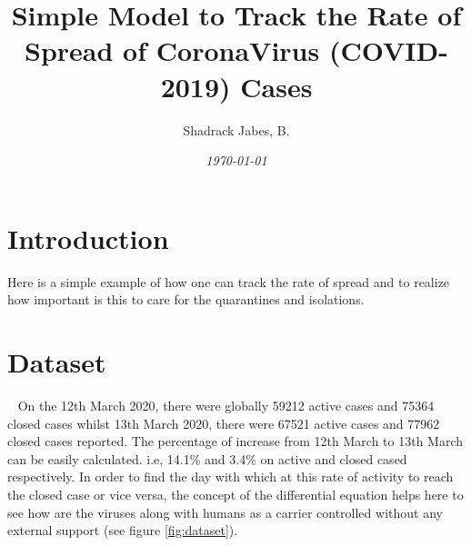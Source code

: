 \documentclass[twocolumn]{article}
\title {Simple Model to Track the Rate of Spread of CoronaVirus (COVID-2019) Cases}
\author{Shadrack Jabes, B.}
\date{\it{\today}}
\begin{document}
\maketitle
\section{Introduction}
Here is a simple example of how one can track the rate of spread and to realize how important is this to care for the quarantines and isolations. 
\section{Dataset} 
On the 12th March 2020, there were globally 59212 active cases and 75364 closed cases whilst 13th March 2020, there were 67521 active cases and 77962 closed cases reported. The percentage of increase from 12th March to 13th March can be easily calculated. i.e, 14.1\% and 3.4\% on active and closed cased respectively. In order to find the day with which at this rate of activity to reach the closed case or vice versa, the concept of the differential equation helps here to see how are the viruses along with humans as a carrier controlled without any external support (see figure \ref{fig:dataset}).
\end{document}
